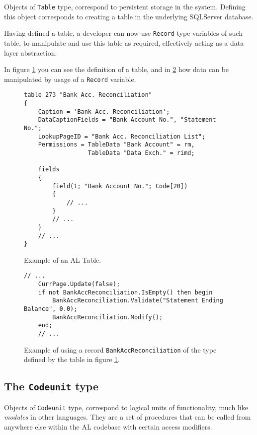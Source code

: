 Objects of \texttt{Table} type, correspond to persistent storage in the system. Defining this object corresponds
to creating a table in the underlying SQLServer database.

Having defined a table, a developer can now use \texttt{Record} type variables of such table,
to manipulate and use this table as required, effectively acting as a data layer abstraction.

In figure \ref{f:app-al-table-alcode} you can see the definition of a table, and in \ref{f:app-al-record-usage}
how data can be manipulated by usage of a \texttt{Record} variable.

\begin{figure}
    \begin{Verbatim}[fontsize=\tiny]
table 273 "Bank Acc. Reconciliation"
{
    Caption = 'Bank Acc. Reconciliation';
    DataCaptionFields = "Bank Account No.", "Statement No.";
    LookupPageID = "Bank Acc. Reconciliation List";
    Permissions = TableData "Bank Account" = rm,
                  TableData "Data Exch." = rimd;

    fields
    {
        field(1; "Bank Account No."; Code[20])
        {
            // ...
        }
        // ...
    }
    // ...
}
    \end{Verbatim}
    \caption{Example of an AL Table.}
    \label{f:app-al-table-alcode}
\end{figure}

\begin{figure}
    \begin{Verbatim}[fontsize=\tiny]
    // ...
    CurrPage.Update(false);
    if not BankAccReconciliation.IsEmpty() then begin
        BankAccReconciliation.Validate("Statement Ending Balance", 0.0);
        BankAccReconciliation.Modify();
    end;
    // ...
    \end{Verbatim}
    \caption{Example of using a record \texttt{BankAccReconciliation} of the type defined by the table in figure \ref{f:app-al-table-alcode}.}
    \label{f:app-al-record-usage}
\end{figure}

\subsection{The \texttt{Codeunit} type}

Objects of \texttt{Codeunit} type, correspond to logical units of functionality, much like \emph{modules} in 
other languages. They are a set of procedures that can be called from anywhere else within the AL codebase
with certain access modifiers.

